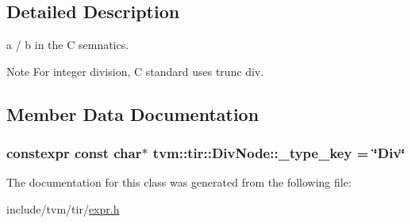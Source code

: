 \subsection{Detailed Description}
a / b in the C semnatics. 

\begin{DoxyNote}{Note}
For integer division, C standard uses trunc div. 
\end{DoxyNote}


\subsection{Member Data Documentation}
\subsubsection[{\texorpdfstring{\+\_\+type\+\_\+key}{_type_key}}]{\setlength{\rightskip}{0pt plus 5cm}constexpr const char$\ast$ tvm\+::tir\+::\+Div\+Node\+::\+\_\+type\+\_\+key = \char`\"{}Div\char`\"{}\hspace{0.3cm}{\ttfamily [static]}}\hypertarget{classtvm_1_1tir_1_1DivNode_ae8bcae6203ba7f84ae2809f6295000b8}{}\label{classtvm_1_1tir_1_1DivNode_ae8bcae6203ba7f84ae2809f6295000b8}


The documentation for this class was generated from the following file\+:\begin{DoxyCompactItemize}
\item 
include/tvm/tir/\hyperlink{tir_2expr_8h}{expr.\+h}\end{DoxyCompactItemize}
